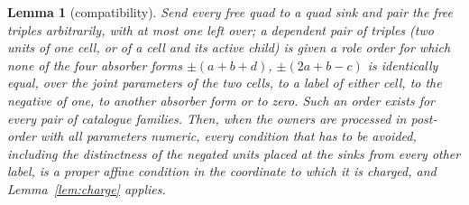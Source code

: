 \documentclass[11pt,a4paper]{article}
\theoremstyle{plain}
\newtheorem{lemma}[theorem]{Lemma}
\theoremstyle{definition}
\theoremstyle{remark}
\begin{document}
\begin{lemma}[compatibility]\label{lem:compat}
Send every free quad to a quad sink and pair the free triples arbitrarily,
with at most one left over; a dependent pair of triples (two units of one
cell, or of a cell and its active child) is given a role order for which none
of the four absorber forms $\pm(a+b+d)$, $\pm(2a+b-c)$ is identically equal,
over the joint parameters of the two cells, to a label of either cell, to the
negative of one, to another absorber form or to zero.  Such an order exists
for every pair of catalogue families.  Then, when the owners are processed in
post-order with all parameters numeric, every condition that has to be
avoided, including the distinctness of the negated units placed at the sinks
from every other label, is a proper affine condition in the coordinate to
which it is charged, and Lemma~\ref{lem:charge} applies.
\end{lemma}
\end{document}

